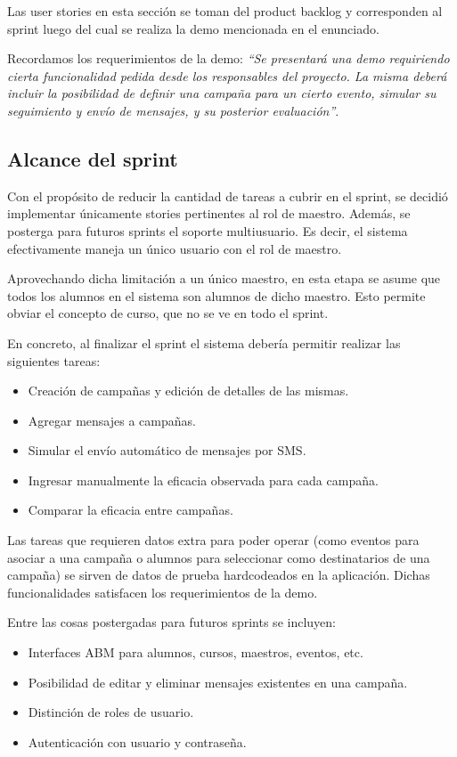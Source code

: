 \documentclass[a4paper, 10pt, twoside]{article}
\begin{document}
Las user stories en esta sección se toman del product backlog y corresponden al sprint luego del cual se realiza la demo mencionada en el enunciado.

Recordamos los requerimientos de la demo: \emph{``Se presentará una demo requiriendo cierta funcionalidad pedida desde los responsables del proyecto. La misma deberá incluir la posibilidad de definir una campaña para un cierto evento, simular su seguimiento y envío de mensajes, y su posterior evaluación''}.


\subsection{Alcance del sprint}

Con el propósito de reducir la cantidad de tareas a cubrir en el sprint, se decidió implementar únicamente stories pertinentes al rol de maestro. Además, se posterga para futuros sprints el soporte multiusuario. Es decir, el sistema efectivamente maneja un único usuario con el rol de maestro.

Aprovechando dicha limitación a un único maestro, en esta etapa se asume que todos los alumnos en el sistema son alumnos de dicho maestro. Esto permite obviar el concepto de curso, que no se ve en todo el sprint.

En concreto, al finalizar el sprint el sistema debería permitir realizar las siguientes tareas:

\begin{itemize}
  \item Creación de campañas y edición de detalles de las mismas.
  \item Agregar mensajes a campañas.
  \item Simular el envío automático de mensajes por SMS.
  \item Ingresar manualmente la eficacia observada para cada campaña.
  \item Comparar la eficacia entre campañas.
\end{itemize}

Las tareas que requieren datos extra para poder operar (como eventos para asociar a una campaña o alumnos para seleccionar como destinatarios de una campaña) se sirven de datos de prueba hardcodeados en la aplicación. Dichas funcionalidades satisfacen los requerimientos de la demo.

Entre las cosas postergadas para futuros sprints se incluyen:

\begin{itemize}
  \item Interfaces ABM para alumnos, cursos, maestros, eventos, etc.
  \item Posibilidad de editar y eliminar mensajes existentes en una campaña.
  \item Distinción de roles de usuario.
  \item Autenticación con usuario y contraseña.
\end{itemize}
\end{document}
